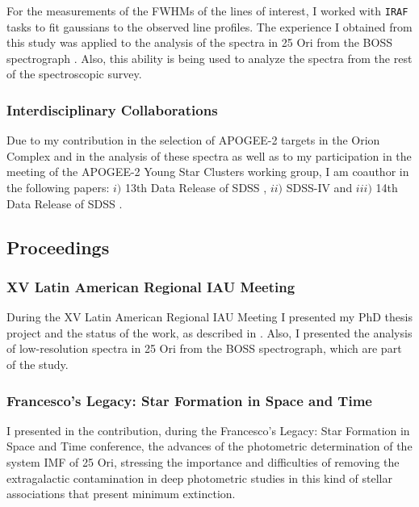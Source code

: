 \documentclass[12pt]{article}
\begin{document}
For the measurements of the FWHMs of the lines of interest, I worked with \texttt{IRAF} tasks to fit gaussians to the observed line profiles. The experience I obtained from this study was applied to the analysis of the spectra in 25 Ori from the BOSS spectrograph \citep{Suarez2017}. Also, this ability is being used to analyze the spectra from the rest of the spectroscopic survey.

\subsubsection{Interdisciplinary Collaborations}
\label{sec:interdisciplinary_collaborations}
Due to my contribution in the selection of APOGEE-2 targets in the Orion Complex and in the analysis of these spectra as well as to my participation in the meeting of the APOGEE-2 Young Star Clusters working group, I am coauthor in the following papers: $i)$ 13th Data Release of SDSS \citep{SDSS-DR13}, $ii)$ SDSS-IV \citep{Blanton2017} and $iii)$ 14th Data Release of SDSS \citep{SDSS-DR14}.

\subsection{Proceedings}
\label{sec:proceedings}

\subsubsection{XV Latin American Regional IAU Meeting}
\label{sec:LARIM2016}
During the XV Latin American Regional IAU Meeting I presented my PhD thesis project and the status of the work, as described in \citet{Suarez2017b}. Also, I presented the analysis of low-resolution spectra in 25 Ori from the BOSS spectrograph, which are part of the \citet{Suarez2017} study.

\subsubsection{Francesco's Legacy: Star Formation in Space and Time}
\label{sec:SFST2017}
I presented in the \citet{Suarez2017c} contribution, during the Francesco's Legacy: Star Formation in Space and Time conference, the advances of the photometric determination of the system IMF of 25 Ori, stressing the importance and difficulties of removing the extragalactic contamination in deep photometric studies in this kind of stellar associations that present minimum extinction.
\end{document}
